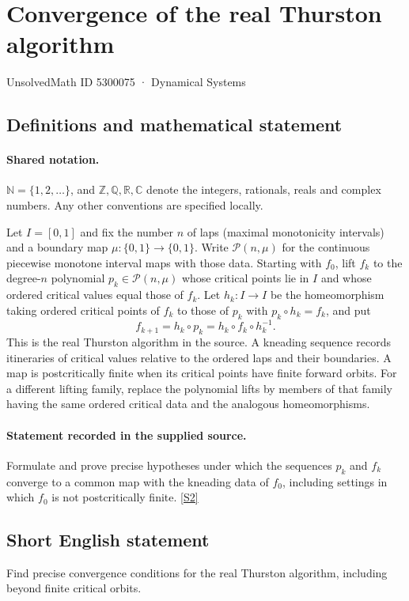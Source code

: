 \documentclass[11pt]{article}
\newcommand{\sref}[2]{\hyperlink{source:#1:#2}{[S#2]}}
\begin{document}
\setcounter{section}{5300074}
\section{Convergence of the real Thurston algorithm}\label{5300075}
{\small\sffamily UnsolvedMath ID 5300075 · Dynamical Systems}
\subsection{Definitions and mathematical statement}

\paragraph{Shared notation.}$\mathbb N=\{1,2,\ldots\}$, and $\mathbb Z,\mathbb Q,\mathbb R,\mathbb C$ denote the integers, rationals, reals and complex numbers. Any other conventions are specified locally.


Let $I=[0,1]$ and fix the number $n$ of laps (maximal monotonicity intervals) and a boundary map $\mu:\{0,1\}\to\{0,1\}$. Write $\mathcal P(n,\mu)$ for the continuous piecewise monotone interval maps with those data. Starting with $f_0$, lift $f_k$ to the degree-$n$ polynomial $p_k\in\mathcal P(n,\mu)$ whose critical points lie in $I$ and whose ordered critical values equal those of $f_k$. Let $h_k:I\to I$ be the homeomorphism taking ordered critical points of $f_k$ to those of $p_k$ with $p_k\circ h_k=f_k$, and put
\[f_{k+1}=h_k\circ p_k=h_k\circ f_k\circ h_k^{-1}.\]
This is the real Thurston algorithm in the source. A kneading sequence records itineraries of critical values relative to the ordered laps and their boundaries. A map is postcritically finite when its critical points have finite forward orbits. For a different lifting family, replace the polynomial lifts by members of that family having the same ordered critical data and the analogous homeomorphisms.
\paragraph{Statement recorded in the supplied source.}
Formulate and prove precise hypotheses under which the sequences $p_k$ and $f_k$ converge to a common map with the kneading data of $f_0$, including settings in which $f_0$ is not postcritically finite. \sref{5300075}{2}
\subsection{Short English statement}
Find precise convergence conditions for the real Thurston algorithm, including beyond finite critical orbits.
\end{document}

